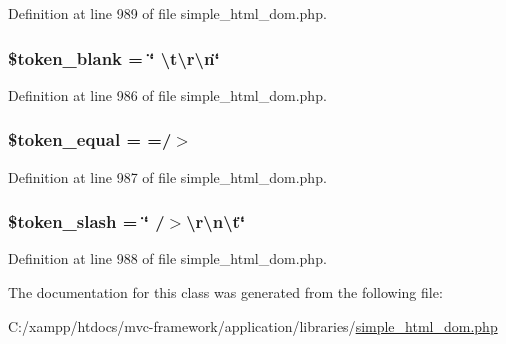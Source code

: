 Definition at line 989 of file simple\+\_\+html\+\_\+dom.\+php.

\hypertarget{classsimple__html__dom_ab7f68c12b4913a3685778154760151cd}{}
\subsubsection[{\$token\+\_\+blank}]{\setlength{\rightskip}{0pt plus 5cm}\$token\+\_\+blank = \char`\"{} \textbackslash{}t\textbackslash{}r\textbackslash{}n\char`\"{}\hspace{0.3cm}{\ttfamily [protected]}}\label{classsimple__html__dom_ab7f68c12b4913a3685778154760151cd}


Definition at line 986 of file simple\+\_\+html\+\_\+dom.\+php.

\hypertarget{classsimple__html__dom_a554179de2a5fb6395ce5ec3ff38f3169}{}
\subsubsection[{\$token\+\_\+equal}]{\setlength{\rightskip}{0pt plus 5cm}\$token\+\_\+equal = \textquotesingle{} =/$>$\textquotesingle{}\hspace{0.3cm}{\ttfamily [protected]}}\label{classsimple__html__dom_a554179de2a5fb6395ce5ec3ff38f3169}


Definition at line 987 of file simple\+\_\+html\+\_\+dom.\+php.

\hypertarget{classsimple__html__dom_a6e9298d28dc391aa70939916476fd4d1}{}
\subsubsection[{\$token\+\_\+slash}]{\setlength{\rightskip}{0pt plus 5cm}\$token\+\_\+slash = \char`\"{} /$>$\textbackslash{}r\textbackslash{}n\textbackslash{}t\char`\"{}\hspace{0.3cm}{\ttfamily [protected]}}\label{classsimple__html__dom_a6e9298d28dc391aa70939916476fd4d1}


Definition at line 988 of file simple\+\_\+html\+\_\+dom.\+php.



The documentation for this class was generated from the following file\+:\begin{DoxyCompactItemize}
\item 
C\+:/xampp/htdocs/mvc-\/framework/application/libraries/\hyperlink{simple__html__dom_8php}{simple\+\_\+html\+\_\+dom.\+php}\end{DoxyCompactItemize}

